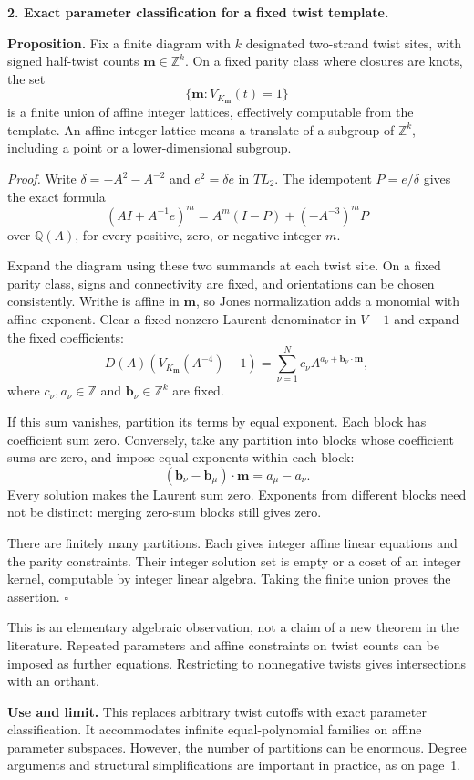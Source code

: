 \documentclass[11pt]{article}
\newcommand{\Q}{\mathbb Q}\newcommand{\Z}{\mathbb Z}
\begin{document}
\newpage
\textbf{2. Exact parameter classification for a fixed twist template.}

\textbf{Proposition.}
Fix a finite diagram with $k$ designated two-strand twist sites, with signed half-twist counts $\mathbf m\in\Z^k$. On a fixed parity class where closures are knots, the set
\[
\{\mathbf m:V_{K_{\mathbf m}}(t)=1\}
\]
is a finite union of affine integer lattices, effectively computable from the template. An affine integer lattice means a translate of a subgroup of $\Z^k$, including a point or a lower-dimensional subgroup.

\textit{Proof.}
Write $\delta=-A^2-A^{-2}$ and $e^2=\delta e$ in $TL_2$. The idempotent $P=e/\delta$ gives the exact formula
\[
(AI+A^{-1}e)^m=A^m(I-P)+(-A^{-3})^mP
\]
over $\Q(A)$, for every positive, zero, or negative integer $m$.

Expand the diagram using these two summands at each twist site. On a fixed parity class, signs and connectivity are fixed, and orientations can be chosen consistently. Writhe is affine in $\mathbf m$, so Jones normalization adds a monomial with affine exponent. Clear a fixed nonzero Laurent denominator in $V-1$ and expand the fixed coefficients:
\[
D(A)(V_{K_{\mathbf m}}(A^{-4})-1)
 =\sum_{\nu=1}^{N}c_\nu A^{a_\nu+\mathbf b_\nu\cdot\mathbf m},
\]
where $c_\nu,a_\nu\in\Z$ and $\mathbf b_\nu\in\Z^k$ are fixed.

If this sum vanishes, partition its terms by equal exponent. Each block has coefficient sum zero. Conversely, take any partition into blocks whose coefficient sums are zero, and impose equal exponents within each block:
\[
(\mathbf b_\nu-\mathbf b_\mu)\cdot\mathbf m=a_\mu-a_\nu .
\]
Every solution makes the Laurent sum zero. Exponents from different blocks need not be distinct: merging zero-sum blocks still gives zero.

There are finitely many partitions. Each gives integer affine linear equations and the parity constraints. Their integer solution set is empty or a coset of an integer kernel, computable by integer linear algebra. Taking the finite union proves the assertion. \hfill$\square$

This is an elementary algebraic observation, not a claim of a new theorem in the literature. Repeated parameters and affine constraints on twist counts can be imposed as further equations. Restricting to nonnegative twists gives intersections with an orthant.

\textbf{Use and limit.}
This replaces arbitrary twist cutoffs with exact parameter classification. It accommodates infinite equal-polynomial families on affine parameter subspaces. However, the number of partitions can be enormous. Degree arguments and structural simplifications are important in practice, as on page~1.
\end{document}
